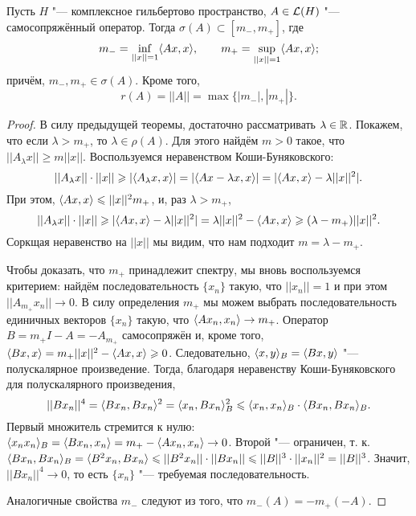 \documentclass[main]{subfiles}
\begin{document}
\begin{theorem}%
  Пусть \( H \) "--- комплексное гильбертово пространство,
  \( A \in \Linears{H} \) "--- самосопряжённый оператор.
  Тогда \( \sigma(A) \subset [m_{-}, m_{+}] \),
  где
  \[
    m_{-} = \inf_{||x||=1} \langle Ax, x \rangle, \qquad
    m_{+} = \sup_{||x||=1} \langle Ax, x \rangle;
  \]
  причём, \( m_{-}, m_{+} \in \sigma(A) \).
  Кроме того,
  \[
    r(A) = ||A|| = \max \{ |m_{-}|, |m_{+}| \}.
  \]
\end{theorem}
\begin{proof}
  В силу предыдущей теоремы, достаточно
  рассматривать \( \lambda \in \mathbb{R} \).
  Покажем, что если \( \lambda > m_+ \),
  то \( \lambda \in \rho(A) \).
  Для этого найдём \( m > 0 \) такое,
  что \( ||A_\lambda x|| \ge m ||x|| \).
  Воспользуемся неравенством Коши-Буняковского:
  \[
    ||A_\lambda x|| \cdot ||x|| \geqslant
    |\langle A_\lambda x, x \rangle| = 
    |\langle A x - \lambda x, x \rangle| = 
    |\langle A x, x \rangle - \lambda ||x||^2|.
  \]
  При этом, \( \langle A x, x \rangle \leqslant ||x||^2 m_+ \),
  и, раз \( \lambda > m_+ \),
  \[
    ||A_\lambda x|| \cdot ||x|| \geqslant
    |\langle Ax, x \rangle - \lambda ||x||^2| =
    \lambda ||x||^2 - \langle Ax, x \rangle \geqslant
    (\lambda - m_+) ||x||^2.
  \]
  Соркщая неравенство на \( ||x|| \)
  мы видим, что нам подходит
  \( m = \lambda - m_+ \).

  Чтобы доказать, что \( m_+ \) принадлежит
  спектру, мы вновь воспользуемся критерием:
  найдём последовательность \( \{ x_n \} \)
  такую, что \( ||x_n|| = 1 \) и
  при этом \( ||A_{m_+} x_n|| \to 0 \).
  В силу определения \( m_+ \) мы можем выбрать
  последовательность единичных векторов \( \{ x_n \} \)
  такую, что \( \langle A x_n, x_n \rangle \to m_+ \).
  Оператор \( B = m_+ I - A = - A_{m_+} \)
  самосопряжён и, кроме того,
  \( \langle Bx, x \rangle = m_+ ||x||^2 - \langle A x, x \rangle \geqslant 0 \).
  Следовательно, \( \langle x, y \rangle_B = \langle Bx, y \rangle \) "---
  полускалярное произведение.
  Тогда, благодаря неравенству Коши-Буняковского для
  полускалярного произведения,
  \[
    ||B x_n||^4 = \langle B x_n, B x_n \rangle^2 =
    \langle x_n, B x_n \rangle_B^2 \leqslant
    \langle x_n, x_n \rangle_B \cdot \langle B x_n, B x_n \rangle_B.
  \]
  Первый множитель стремится к нулю:
  \( \langle x_n x_n \rangle_B = \langle B x_n, x_n \rangle = 
  m_+ - \langle A x_n, x_n \rangle \to 0 \).
  Второй "--- ограничен, т. к.
  \( \langle B x_n, B x_n \rangle_B =
  \langle B^2 x_n, B x_n \rangle \leqslant
  ||B^2 x_n|| \cdot ||B x_n|| \leqslant
  ||B||^3 \cdot ||x_n||^2 = ||B||^3 \).
  Значит, \( ||B x_n||^4 \to 0 \),
  то есть \( \{ x_n \} \) "--- требуемая последовательность.

  Аналогичные свойства \( m_- \) следуют из того,
  что \( m_-(A) = -m_+(-A) \).


\end{proof}
\end{document}
